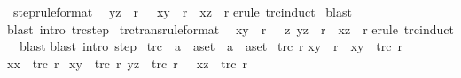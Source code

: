 \begin{isabellebody}
\ step{}{\isacharbrackleft}rule{\isacharunderscore}format{\isacharbrackright}{\isacharcolon}\isanewline
\ \ {\isachardoublequote}{\isacharparenleft}y{\isacharcomma}z{\isacharparenright}\ {\isasymin}\ r{\isacharasterisk}\ \ {\isasymLongrightarrow}\ {\isacharparenleft}x{\isacharcomma}y{\isacharparenright}\ {\isasymin}\ r\ {\isasymlongrightarrow}\ {\isacharparenleft}x{\isacharcomma}z{\isacharparenright}\ {\isasymin}\ r{\isacharasterisk}{\isachardoublequote}\isanewline
{}erule\ trc{\isachardot}induct{\isacharparenright}\isanewline
\ blast{\isacharparenright}\isanewline
{}blast\ intro{\isacharcolon}\ trc{\isacharunderscore}step{\isacharparenright}\isanewline
{}\isanewline
\isanewline
{}\ trc{\isacharunderscore}trans{\isacharbrackleft}rule{\isacharunderscore}format{\isacharbrackright}{\isacharcolon}\isanewline
\ \ {\isachardoublequote}{\isacharparenleft}x{\isacharcomma}y{\isacharparenright}\ {\isasymin}\ r{\isacharasterisk}\ \ {\isasymLongrightarrow}\ {\isasymforall}z{\isachardot}\ {\isacharparenleft}y{\isacharcomma}z{\isacharparenright}\ {\isasymin}\ r{\isacharasterisk}\ {\isasymlongrightarrow}\ {\isacharparenleft}x{\isacharcomma}z{\isacharparenright}\ {\isasymin}\ r{\isacharasterisk}{\isachardoublequote}\isanewline
{}erule\ trc{\isachardot}induct{\isacharparenright}\isanewline
\ \ blast\isanewline
{}blast\ intro{\isacharcolon}\ step{}{\isacharparenright}\isanewline
{}\isanewline
\isanewline
{}\ trc{}\ {\isacharcolon}{\isacharcolon}\ {\isachardoublequote}{\isacharparenleft}{\isacharprime}a\ {\isasymtimes}\ {\isacharprime}a{\isacharparenright}set\ {\isasymRightarrow}\ {\isacharparenleft}{\isacharprime}a\ {\isasymtimes}\ {\isacharprime}a{\isacharparenright}set{\isachardoublequote}\isanewline
{}\ {\isachardoublequote}trc{}\ r{\isachardoublequote}\isanewline
{}\isanewline
{\isachardoublequote}{\isacharparenleft}x{\isacharcomma}y{\isacharparenright}\ {\isasymin}\ r\ {\isasymLongrightarrow}\ {\isacharparenleft}x{\isacharcomma}y{\isacharparenright}\ {\isasymin}\ trc{}\ r{\isachardoublequote}\isanewline
{\isachardoublequote}{\isacharparenleft}x{\isacharcomma}x{\isacharparenright}\ {\isasymin}\ trc{}\ r{\isachardoublequote}\isanewline
{\isachardoublequote}{\isasymlbrakk}\ {\isacharparenleft}x{\isacharcomma}y{\isacharparenright}\ {\isasymin}\ trc{}\ r{\isacharsemicolon}\ {\isacharparenleft}y{\isacharcomma}z{\isacharparenright}\ {\isasymin}\ trc{}\ r\ {\isasymrbrakk}\ {\isasymLongrightarrow}\ {\isacharparenleft}x{\isacharcomma}z{\isacharparenright}\ {\isasymin}\ trc{}\ r{\isachardoublequote}\isanewline

\end{isabellebody}
